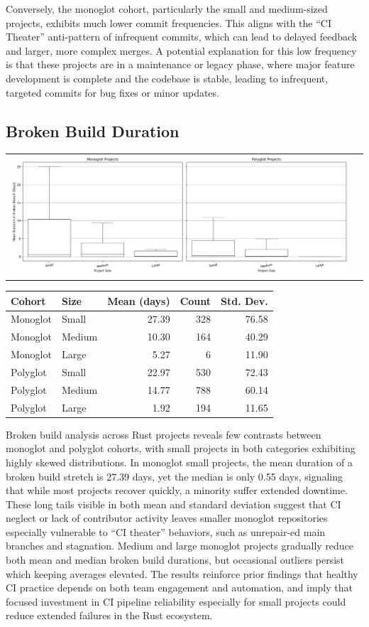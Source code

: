 \documentclass[11pt]{article}
\begin{document}
Conversely, the monoglot cohort, particularly the small and medium-sized projects, exhibits much lower commit frequencies. This aligns with the ``CI Theater'' anti-pattern of infrequent commits, which can lead to delayed feedback and larger, more complex merges.  A potential explanation for this low frequency is that these projects are in a maintenance or legacy phase, where major feature development is complete and the codebase is stable, leading to infrequent, targeted commits for bug fixes or minor updates.

\subsection{Broken Build Duration}
\begin{tabularx}{\linewidth}{@{}XX@{}}
\includegraphics[width=\linewidth]{figures/broken_build_duration.jpg}
\end{tabularx}
\begin{center}
\begin{tabular}{llrrr}
Cohort & Size & Mean (days) & Count & Std. Dev.\\
\hline
Monoglot & Small & 27.39 & 328 & 76.58\\
Monoglot & Medium & 10.30 & 164 & 40.29\\
Monoglot & Large & 5.27 & 6 & 11.90\\
Polyglot & Small & 22.97 & 530 & 72.43\\
Polyglot & Medium & 14.77 & 788 & 60.14\\
Polyglot & Large & 1.92 & 194 & 11.65\\
\end{tabular}
\end{center}
Broken build analysis across Rust projects reveals few contrasts between monoglot and polyglot cohorts, with small projects in both categories exhibiting highly skewed distributions. In monoglot small projects, the mean duration of a broken build stretch is 27.39 days, yet the median is only 0.55 days, signaling that while most projects recover quickly, a minority suffer extended downtime. These long tails visible in both mean and standard deviation suggest that CI neglect or lack of contributor activity leaves smaller monoglot repositories especially vulnerable to “CI theater” behaviors, such as unrepair-ed main branches and stagnation. Medium and large monoglot projects gradually reduce both mean and median broken build durations, but occasional outliers persist which keeping averages elevated. The results reinforce prior findings that healthy CI practice depends on both team engagement and automation, and imply that focused investment in CI pipeline reliability especially for small projects could reduce extended failures in the Rust ecosystem.
\end{document}
